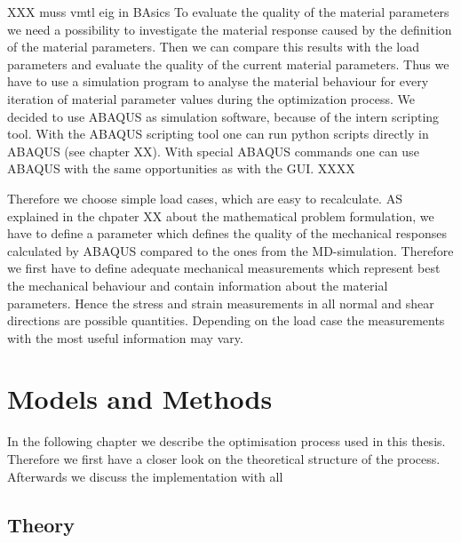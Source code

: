 
    XXX muss vmtl eig in BAsics
    To evaluate the quality of the material parameters we need a possibility to investigate the material response caused by the definition of the material parameters. Then we can compare this results with the load parameters and evaluate the quality of the current material parameters. Thus we have to use a simulation program to analyse the material behaviour for every iteration of material parameter values during the optimization process. We decided to use ABAQUS as simulation software, because of the intern scripting tool. With the ABAQUS scripting tool one can run python scripts directly in ABAQUS (see chapter XX). With special ABAQUS commands one can use ABAQUS with the same opportunities as with the GUI. 
    XXXX

    Therefore we choose simple load cases, which are easy to recalculate. AS explained in the chpater XX about the mathematical problem formulation, we have to define a parameter which defines the quality of the mechanical responses calculated by ABAQUS compared to the ones from the MD-simulation. Therefore we first have to define adequate mechanical measurements which represent best the mechanical behaviour and contain information about the material parameters. Hence the stress and strain measurements in all normal and shear directions are possible quantities. Depending on the load case the measurements with the most useful information may vary.
    

    
    \chapter{Models and Methods}

    In the following chapter we describe the optimisation process used in this thesis. Therefore we first have a closer look on the theoretical structure of the process. Afterwards we discuss the implementation with all 

    \section{Theory}

